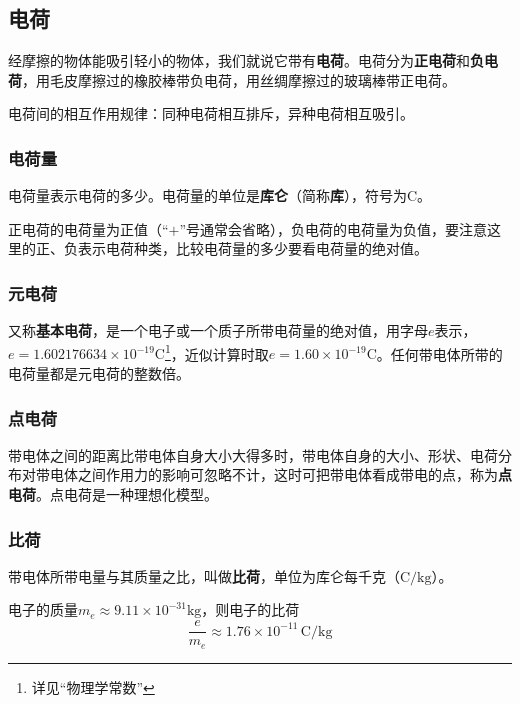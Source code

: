 
\subsection{电荷}

经摩擦的物体能吸引轻小的物体，我们就说它带有\textbf{电荷}。电荷分为\textbf{正电荷}和\textbf{负电荷}，用毛皮摩擦过的橡胶棒带负电荷，用丝绸摩擦过的玻璃棒带正电荷。

电荷间的相互作用规律：同种电荷相互排斥，异种电荷相互吸引。

\subsubsection{电荷量}

电荷量表示电荷的多少。电荷量的单位是\textbf{库仑}（简称\textbf{库}），符号为$\mathrm{C}$。

正电荷的电荷量为正值（“$+$”号通常会省略），负电荷的电荷量为负值，要注意这里的正、负表示电荷种类，比较电荷量的多少要看电荷量的绝对值。

\subsubsection{元电荷}

又称\textbf{基本电荷}，是一个电子或一个质子所带电荷量的绝对值，用字母$e$表示，$e = 1.602176634 \times 10^{-19} \mathrm{C}$\footnote{详见“物理学常数”}，近似计算时取$e = 1.60 \times 10^{-19} \mathrm{C}$。任何带电体所带的电荷量都是元电荷的整数倍。

\subsubsection{点电荷}

带电体之间的距离比带电体自身大小大得多时，带电体自身的大小、形状、电荷分布对带电体之间作用力的影响可忽略不计，这时可把带电体看成带电的点，称为\textbf{点电荷}。点电荷是一种理想化模型。

\subsubsection{比荷}

带电体所带电量与其质量之比，叫做\textbf{比荷}，单位为库仑每千克（$\mathrm{C/kg}$）。

电子的质量$m_e \approx 9.11 \times 10^{-31} \mathrm{kg}$，则电子的比荷
\begin{equation}
\frac{e}{m_e} \approx 1.76 \times 10^{-11} \,\mathrm{C/kg}
\end{equation}

